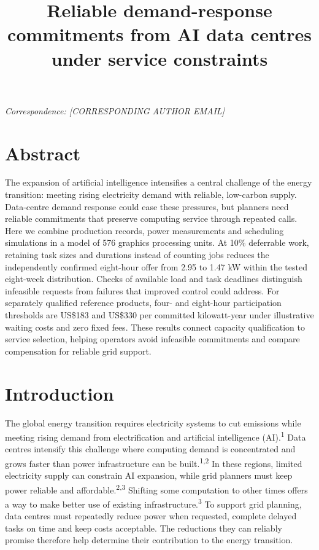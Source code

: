 \documentclass[10pt,a4paper]{article}
\title{\sffamily\bfseries Reliable demand-response commitments from AI data centres under service constraints}
\author{\sffamily [AUTHOR NAMES AND AFFILIATIONS]}
\date{}
\begin{document}
\maketitle
\thispagestyle{fancy}




\emph{Correspondence: [CORRESPONDING AUTHOR EMAIL]}


\section*{Abstract}

The expansion of artificial intelligence intensifies a central challenge of the energy transition: meeting rising electricity demand with reliable, low-carbon supply. Data-centre demand response could ease these pressures, but planners need reliable commitments that preserve computing service through repeated calls. Here we combine production records, power measurements and scheduling simulations in a model of 576 graphics processing units. At 10\% deferrable work, retaining task sizes and durations instead of counting jobs reduces the independently confirmed eight-hour offer from 2.95 to 1.47 kW within the tested eight-week distribution. Checks of available load and task deadlines distinguish infeasible requests from failures that improved control could address. For separately qualified reference products, four- and eight-hour participation thresholds are US\$183 and US\$330 per committed kilowatt-year under illustrative waiting costs and zero fixed fees. These results connect capacity qualification to service selection, helping operators avoid infeasible commitments and compare compensation for reliable grid support.


\section*{Introduction}

The global energy transition requires electricity systems to cut emissions while meeting rising demand from electrification and artificial intelligence (AI).\textsuperscript{1} Data centres intensify this challenge where computing demand is concentrated and grows faster than power infrastructure can be built.\textsuperscript{1,2} In these regions, limited electricity supply can constrain AI expansion, while grid planners must keep power reliable and affordable.\textsuperscript{2,3} Shifting some computation to other times offers a way to make better use of existing infrastructure.\textsuperscript{3} To support grid planning, data centres must repeatedly reduce power when requested, complete delayed tasks on time and keep costs acceptable. The reductions they can reliably promise therefore help determine their contribution to the energy transition.
\end{document}
